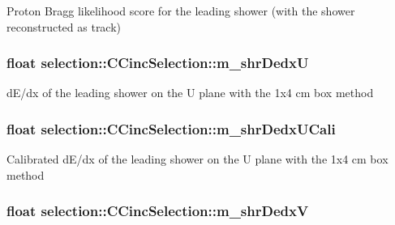 Proton Bragg likelihood score for the leading shower (with the shower reconstructed as track) \hypertarget{classselection_1_1CCincSelection_a8874fb100e151832807ab459419e69d3}{
\subsubsection[{m\-\_\-shr\-Dedx\-U}]{\setlength{\rightskip}{0pt plus 5cm}float selection\-::\-C\-Cinc\-Selection\-::m\-\_\-shr\-Dedx\-U\hspace{0.3cm}{\ttfamily [private]}}}\label{classselection_1_1CCincSelection_a8874fb100e151832807ab459419e69d3}
d\-E/dx of the leading shower on the U plane with the 1x4 cm box method \hypertarget{classselection_1_1CCincSelection_abd57a8d6290e142e526636a4ec851801}{
\subsubsection[{m\-\_\-shr\-Dedx\-U\-Cali}]{\setlength{\rightskip}{0pt plus 5cm}float selection\-::\-C\-Cinc\-Selection\-::m\-\_\-shr\-Dedx\-U\-Cali\hspace{0.3cm}{\ttfamily [private]}}}\label{classselection_1_1CCincSelection_abd57a8d6290e142e526636a4ec851801}
Calibrated d\-E/dx of the leading shower on the U plane with the 1x4 cm box method \hypertarget{classselection_1_1CCincSelection_a2d1f501922cf14e3d1f6fb8cc8e63173}{
\subsubsection[{m\-\_\-shr\-Dedx\-V}]{\setlength{\rightskip}{0pt plus 5cm}float selection\-::\-C\-Cinc\-Selection\-::m\-\_\-shr\-Dedx\-V\hspace{0.3cm}{\ttfamily [private]}}}\label{classselection_1_1CCincSelection_a2d1f501922cf14e3d1f6fb8cc8e63173}
